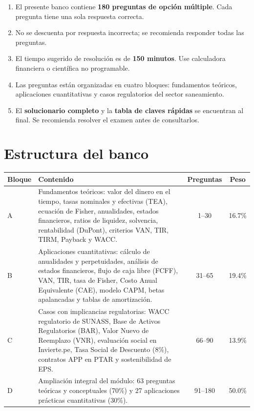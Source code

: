 \documentclass[11pt,a4paper]{article}
\begin{document}
\begin{enumerate}[label=\arabic*.,leftmargin=1.6em,itemsep=3pt]
  \item El presente banco contiene \textbf{180 preguntas de opción múltiple}. Cada pregunta tiene una sola respuesta correcta.
  \item No se descuenta por respuesta incorrecta; se recomienda responder todas las preguntas.
  \item El tiempo sugerido de resolución es de \textbf{150 minutos}. Use calculadora financiera o científica no programable.
  \item Las preguntas están organizadas en cuatro bloques: fundamentos teóricos, aplicaciones cuantitativas y casos regulatorios del sector saneamiento.
  \item El \textbf{solucionario completo} y la \textbf{tabla de claves rápidas} se encuentran al final. Se recomienda resolver el examen antes de consultarlos.
\end{enumerate}

\section*{Estructura del banco}

\begin{center}
\renewcommand{\arraystretch}{1.25}
\begin{tabular}{@{}p{1.4cm}>{\raggedright\arraybackslash}p{7.6cm}cc@{}}
\toprule
\textbf{Bloque} & \textbf{Contenido} & \textbf{Preguntas} & \textbf{Peso} \\
\midrule
A & Fundamentos teóricos: valor del dinero en el tiempo, tasas nominales y efectivas (TEA), ecuación de Fisher, anualidades, estados financieros, ratios de liquidez, solvencia, rentabilidad (DuPont), criterios VAN, TIR, TIRM, Payback y WACC. & 1--30 & 16.7\% \\
B & Aplicaciones cuantitativas: cálculo de anualidades y perpetuidades, análisis de estados financieros, flujo de caja libre (FCFF), VAN, TIR, tasa de Fisher, Costo Anual Equivalente (CAE), modelo CAPM, betas apalancadas y tablas de amortización. & 31--65 & 19.4\% \\
C & Casos con implicancias regulatorias: WACC regulatorio de SUNASS, Base de Activos Regulatorios (BAR), Valor Nuevo de Reemplazo (VNR), evaluación social en Invierte.pe, Tasa Social de Descuento (8\%), contratos APP en PTAR y sostenibilidad de EPS. & 66--90 & 13.9\% \\
D & Ampliación integral del módulo: 63 preguntas teóricas y conceptuales (70\%) y 27 aplicaciones prácticas cuantitativas (30\%). & 91--180 & 50.0\% \\
\bottomrule
\end{tabular}
\end{center}
\end{document}
